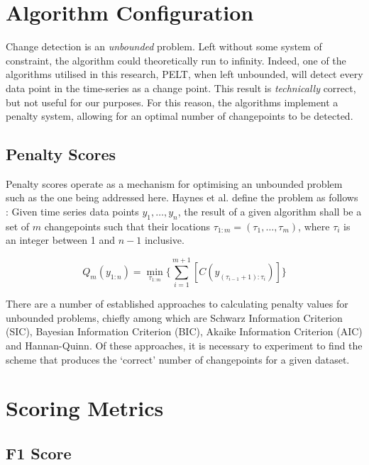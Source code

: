 \documentclass{uvamscse}	%
\begin{document}
\section{Algorithm Configuration}

Change detection is an \emph{unbounded} problem. Left without some system of constraint, the algorithm could theoretically run to infinity. Indeed, one of the algorithms utilised in this research, PELT, when left unbounded, will detect every data point in the time-series as a change point. This result is \textit{technically} correct, but not useful for our purposes. For this reason, the algorithms implement a penalty system, allowing for an optimal number of changepoints to be detected.

\subsection{Penalty Scores}

Penalty scores operate as a mechanism for optimising an unbounded problem such as the one being addressed here. Haynes et al. define the problem as follows \cite{Haynes2014}: Given time series data points $y_1,\ldots,y_n$, the result of a given algorithm shall be a set of $m$ changepoints such that their locations $\tau_{1:m} = (\tau_1,\ldots,\tau_m)$, where $\tau_i$ is an integer between 1 and $n-1$ inclusive.

\begin{equation}
    Q_m(y_{1:n}) = \min_{\tau_{1:m}} \Bigg\{ \sum^{m+1}_{i=1}[C(y_{(\tau_{i - 1} + 1):\tau_i})] \Bigg\}
\end{equation}

There are a number of established approaches to calculating penalty values for unbounded problems, chiefly among which are Schwarz Information Criterion (SIC), Bayesian Information Criterion (BIC), Akaike Information Criterion (AIC) and Hannan-Quinn. Of these approaches, it is necessary to experiment to find the scheme that produces the `correct' number of changepoints for a given dataset.

\section{Scoring Metrics}

\subsection{F1 Score}
\end{document}
